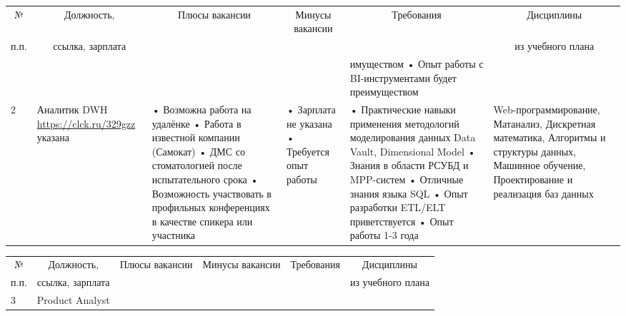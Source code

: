 \documentclass[14pt]{extreport}
\begin{document}
\begin{landscape}
\begin{table}[H]
	\begin{center}
		\begin{small}
		\begin{tabular}{|p{0.1cm}|p{5cm}|p{4.5cm}|p{4.5cm}|p{4cm}|p{3cm}|} \hline
			\multicolumn{1}{|c|}{№}&\multicolumn{1}{c|}{Должность,}&\multicolumn{1}{c|}{Плюсы вакансии}&\multicolumn{1}{c|}{Минусы вакансии}&\multicolumn{1}{c|}{Требования}&\multicolumn{1}{c|}{Дисциплины}\\ 
			\multicolumn{1}{|c|}{п.п.}&\multicolumn{1}{c|}{ссылка, зарплата}&\multicolumn{1}{c|}{}&\multicolumn{1}{c|}{}&\multicolumn{1}{c|}{}&\multicolumn{1}{c|}{из учебного плана}\\ 
			\hline
			&
			&
			&
			&
			имуществом
			\newline• Опыт работы с BI-инструментами будет преимуществом
			&
			\\
			\hline
			2 & Аналитик DWH
			\newline\url{https://clck.ru/329gzz}
			 указана
			&
			• Возможна работа на удалёнке
			\newline• Работа в известной компании (Самокат)
			\newline• ДМС со стоматологией после испытательного срока
			\newline• Возможность участвовать в профильных конференциях в качестве спикера или участника
			&
			• Зарплата не указана
			\newline• Требуется опыт работы
			&
			• Практические навыки применения методологий моделирования данных Data Vault, Dimensional Model
			\newline• Знания в области РСУБД и MPP-систем
			\newline• Отличные знания языка SQL
			\newline• Опыт разработки ETL/ELT приветствуется
			\newline• Опыт работы 1-3 года
			&
			Web-программирование, Матанализ, Дискретная математика, Алгоритмы и структуры данных, Машинное обучение, Проектирование и реализация баз данных
			\\
			\hline
			\end{tabular}
		\end{small}
	\end{center}
\end{table}
			
			

\begin{table}[H]
	\begin{center}
		\begin{small}
		\begin{tabular}{|p{0.1cm}|p{5cm}|p{4.5cm}|p{4.5cm}|p{4cm}|p{3cm}|} \hline
			\multicolumn{1}{|c|}{№}&\multicolumn{1}{c|}{Должность,}&\multicolumn{1}{c|}{Плюсы вакансии}&\multicolumn{1}{c|}{Минусы вакансии}&\multicolumn{1}{c|}{Требования}&\multicolumn{1}{c|}{Дисциплины}\\ 
			\multicolumn{1}{|c|}{п.п.}&\multicolumn{1}{c|}{ссылка, зарплата}&\multicolumn{1}{c|}{}&\multicolumn{1}{c|}{}&\multicolumn{1}{c|}{}&\multicolumn{1}{c|}{из учебного плана}\\ 
			\hline
				3 & Product Analyst
				

\end{tabular}
\end{small}
\end{center}
\end{table}
\end{landscape}
\end{document}
